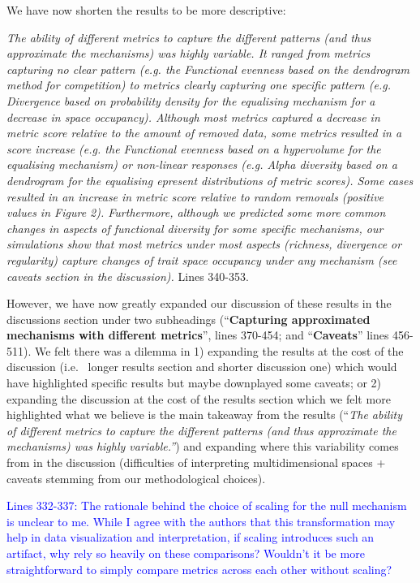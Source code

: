 \documentclass[
]{article}
\begin{document}
We have now shorten the results to be more descriptive:

\textit{The ability of different metrics to capture the different patterns (and thus approximate the mechanisms) was highly variable.
It ranged from metrics capturing no clear pattern (e.g. the Functional evenness based on the dendrogram method for competition) to metrics clearly capturing one specific pattern (e.g. Divergence based on probability density for the equalising mechanism for a decrease in space occupancy).
Although most metrics captured a decrease in metric score relative to the amount of removed data, some metrics resulted in a score increase (e.g. the Functional evenness based on a hypervolume for the equalising mechanism) or non-linear responses (e.g. Alpha diversity based on a dendrogram for the equalising epresent distributions of metric scores).
Some cases resulted in an increase in metric score relative to random removals (positive values in Figure 2).
Furthermore, although we predicted some more common changes in aspects of functional diversity for some specific mechanisms, our simulations show that most metrics under most aspects (richness, divergence or regularity) capture changes of trait space occupancy under any mechanism (see caveats section in the discussion).}
Lines 340-353.

However, we have now greatly expanded our discussion of these results in the discussions section under two subheadings (``\textbf{Capturing approximated mechanisms with different metrics}'', lines 370-454; and ``\textbf{Caveats}'' lines 456-511).
We felt there was a dilemma in 1) expanding the results at the cost of the discussion (i.e.~ longer results section and shorter discussion one) which would have highlighted specific results but maybe downplayed some caveats; or 2) expanding the discussion at the cost of the results section which we felt more highlighted what we believe is the main takeaway from the results (``\textit{The ability of different metrics to capture the different patterns (and thus approximate the mechanisms) was highly variable.''}) and expanding where this variability comes from in the discussion (difficulties of interpreting multidimensional spaces + caveats stemming from our methodological choices).

\textcolor{blue}{Lines 332-337: The rationale behind the choice of scaling for the null mechanism is unclear to me.
While I agree with the authors that this transformation may help in data visualization and interpretation, if scaling introduces such an artifact, why rely so heavily on these comparisons? Wouldn't it be more straightforward to simply compare metrics across each other without scaling?}
\end{document}
